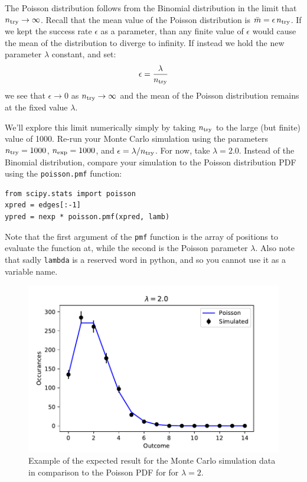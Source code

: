 The Poisson distribution follows from the Binomial distribution in the
limit that $n_{\rm try} \to \infty$.  Recall that the mean value of
the Poisson distribution is $\bar{m} = \epsilon \, n_{\rm try}$.  If
we kept the success rate $\epsilon$ as a parameter, than any finite
value of $\epsilon$ would cause the mean of the distribution to diverge to infinity.
If instead we hold the new parameter $\lambda$ constant, and set:
\begin{displaymath}
\epsilon = \frac{\lambda}{n_{\rm try}}
\end{displaymath}
we see that $\epsilon \to 0$ as $n_{\rm try} \to \infty$ and the mean
of the Poisson distribution remains at the fixed value $\lambda$.

We'll explore this limit numerically simply by taking $n_{\rm try}$ to
the large (but finite) value of 1000.  Re-run your Monte Carlo
simulation using the parameters $n_{\rm try} = 1000$, $n_{\rm exp} =
1000$, and $\epsilon = \lambda / n_{\rm try}$.  For now, take $\lambda
= 2.0$.  Instead of the Binomial distribution, compare your simulation to the Poisson distribution PDF
using the {\tt poisson.pmf} function:
\begin{verbatim}
from scipy.stats import poisson
xpred = edges[:-1]
ypred = nexp * poisson.pmf(xpred, lamb) 
\end{verbatim}
Note that the first argument of the {\tt pmf} function is the array of
positions to evaluate the function at, while the second is the Poisson
parameter $\lambda$.  Also note that sadly {\tt lambda} is a reserved word
in python, and so you cannot use it as a variable name.

\begin{figure}[htbp]
\begin{center}
\includegraphics[height=0.22\textheight]{figs/labs/distributions/poisson.pdf}
\end{center}
\caption{\label{fig:poisson} Example of the expected result for the Monte Carlo simulation data in comparison to the Poisson PDF for for $\lambda=2$. }
\end{figure}

